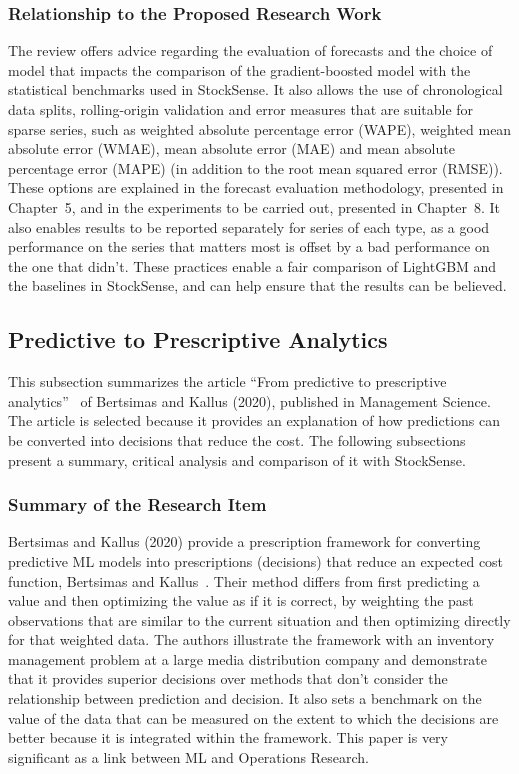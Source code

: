 \documentclass{StockSense}
\begin{document}
\subsubsection{Relationship to the Proposed Research Work}

The review offers advice regarding the evaluation of forecasts and the choice of model that impacts the comparison of the gradient-boosted model with the statistical benchmarks used in StockSense. It also allows the use of chronological data splits, rolling-origin validation and error measures that are suitable for sparse series, such as weighted absolute percentage error (WAPE), weighted mean absolute error (WMAE), mean absolute error (MAE) and mean absolute percentage error (MAPE) (in addition to the root mean squared error (RMSE)). These options are explained in the forecast evaluation methodology, presented in Chapter~5, and in the experiments to be carried out, presented in Chapter~8. It also enables results to be reported separately for series of each type, as a good performance on the series that matters most is offset by a bad performance on the one that didn't. These practices enable a fair comparison of LightGBM and the baselines in StockSense, and can help ensure that the results can be believed.

\subsection{Predictive to Prescriptive Analytics}

This subsection summarizes the article “From predictive to prescriptive analytics”~\cite{bertsimas2020predictive} of Bertsimas and Kallus (2020), published in Management Science. The article is selected because it provides an explanation of how predictions can be converted into decisions that reduce the cost. The following subsections present a summary, critical analysis and comparison of it with StockSense.

\subsubsection{Summary of the Research Item}

Bertsimas and Kallus (2020) provide a prescription framework for converting predictive ML models into prescriptions (decisions) that reduce an expected cost function, Bertsimas and Kallus~\cite{bertsimas2020predictive}. Their method differs from first predicting a value and then optimizing the value as if it is correct, by weighting the past observations that are similar to the current situation and then optimizing directly for that weighted data. The authors illustrate the framework with an inventory management problem at a large media distribution company and demonstrate that it provides superior decisions over methods that don't consider the relationship between prediction and decision. It also sets a benchmark on the value of the data that can be measured on the extent to which the decisions are better because it is integrated within the framework. This paper is very significant as a link between ML and Operations Research.
\end{document}
